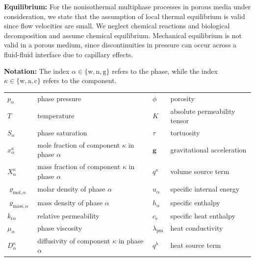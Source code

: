 \textbf{Equilibrium:}
For the nonisothermal multiphase processes in porous media under
consideration, we state that the assumption of local thermal
equilibrium is valid since flow velocities are small. We neglect
chemical reactions and biological decomposition and assume chemical
equilibrium.  Mechanical equilibrium is not valid in a porous medium, 
since discontinuities in pressure can occur across a fluid-fluid
interface due to capillary effects.

\textbf{Notation:} The index $\alpha \in \{\text{w}, \text{n}, \text{g}\}$ refers 
to the phase, while the index $\kappa \in \{\text{w}, \text{a}, \text{c}\}$ refers 
to the component. \\
\begin{tabular}{llll}
$p_\alpha$ & phase pressure & $\phi$ & porosity \\
$T$ & temperature & $K$ & absolute permeability tensor \\
$S_\alpha$ & phase saturation & $\tau$ & tortuosity \\
$x_\alpha^\kappa$ & mole fraction of component $\kappa$ in phase $\alpha$ & $\boldsymbol{g}$ & gravitational acceleration \\
$X_\alpha^\kappa$ & mass fraction of component $\kappa$ in phase $\alpha$ & $q^\kappa$ & volume source term \\
$\varrho_{\text{mol},\alpha}$ & molar density of phase $\alpha$ & $u_\alpha$ & specific internal energy \\
$\varrho_{\text{mass},\alpha}$ & mass density of phase $\alpha$ & $h_\alpha$ & specific enthalpy \\
$k_{\text{r}\alpha}$ & relative permeability & $c_\text{s}$ & specific heat enthalpy \\
$\mu_\alpha$ & phase viscosity & $\lambda_\text{pm}$ & heat conductivity \\
$D_\alpha^\kappa$ & diffusivity of component $\kappa$ in phase $\alpha$ & $q^h$ & heat source term 
\end{tabular}


